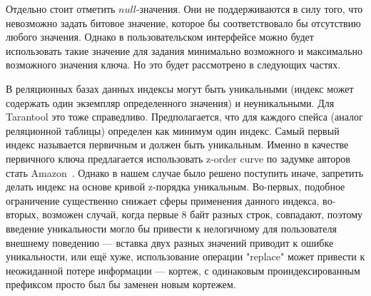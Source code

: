 Отдельно стоит отметить $null$-значения. Они не поддерживаются в силу того, что невозможно задать битовое значение, которое бы соответствовало бы отсутствию любого значения.
Однако в пользовательском интерфейсе можно будет использовать такие значение для задания минимально возможного и максимально возможного значения ключа. Но это будет рассмотрено в следующих частях.

В реляционных базах данных индексы могут быть уникальными (индекс может содержать один экземпляр определенного значения) и неуникальными. Для Tarantool это тоже справедливо. Предполагается, что  для каждого спейса (аналог реляционной таблицы) определен как минимум один индекс.
Самый первый индекс называется первичным и должен быть уникальным.
Именно в качестве первичного ключа предлагается использовать z-order curve по задумке авторов стать Amazon~\cite{DynamoZorderP1, DynamoZorderP2}.
Однако в нашем случае было решено поступить иначе, запретить делать индекс на основе кривой z-порядка уникальным.
Во-первых, подобное ограничение существенно снижает сферы применения данного индекса,
во-вторых, возможен случай, когда первые 8 байт разных строк, совпадают,
поэтому введение уникальности могло бы привести к нелогичному для пользователя внешнему поведению ---
вставка двух разных значений приводит к ошибке уникальности, или ещё хуже, использование операции "replace"
может привести к неожиданной потере информации --- кортеж, с одинаковым проиндексированным префиксом
просто был бы заменен новым кортежем.

